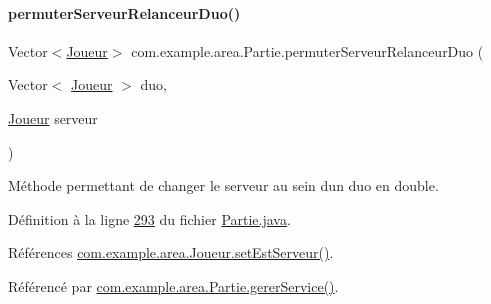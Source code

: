 \paragraph{\texorpdfstring{permuter\+Serveur\+Relanceur\+Duo()}{permuterServeurRelanceurDuo()}}
{\footnotesize\ttfamily Vector$<$\hyperlink{classcom_1_1example_1_1area_1_1_joueur}{Joueur}$>$ com.\+example.\+area.\+Partie.\+permuter\+Serveur\+Relanceur\+Duo (\begin{DoxyParamCaption}\item[{Vector$<$ \hyperlink{classcom_1_1example_1_1area_1_1_joueur}{Joueur} $>$}]{duo,  }\item[{\hyperlink{classcom_1_1example_1_1area_1_1_joueur}{Joueur}}]{serveur }\end{DoxyParamCaption})\hspace{0.3cm}{\ttfamily [private]}}



Méthode permettant de changer le serveur au sein d\textquotesingle{}un duo en double. 



Définition à la ligne \hyperlink{_partie_8java_source_l00293}{293} du fichier \hyperlink{_partie_8java_source}{Partie.\+java}.



Références \hyperlink{_joueur_8java_source_l00063}{com.\+example.\+area.\+Joueur.\+set\+Est\+Serveur()}.



Référencé par \hyperlink{_partie_8java_source_l00220}{com.\+example.\+area.\+Partie.\+gerer\+Service()}.



